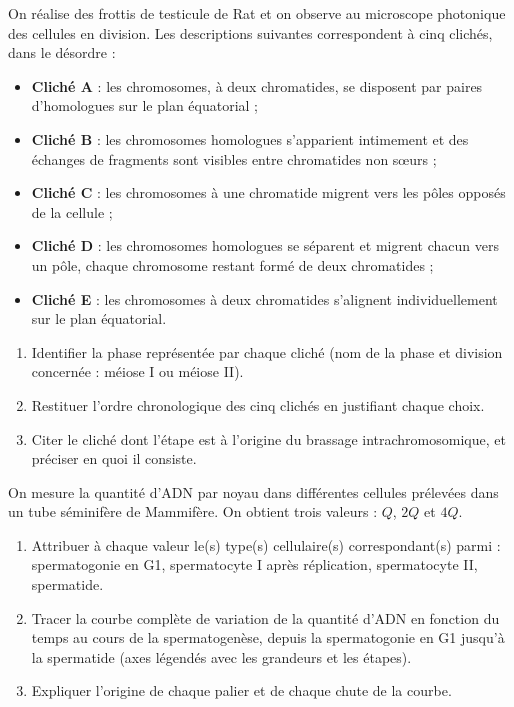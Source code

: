 \documentclass[11pt]{article}
\begin{document}
\begin{exercice}
On réalise des frottis de testicule de Rat et on observe au microscope photonique des cellules en division. Les descriptions suivantes correspondent à cinq clichés, dans le désordre :
\begin{itemize}
\item \textbf{Cliché A} : les chromosomes, à deux chromatides, se disposent par paires d'homologues sur le plan équatorial ;
\item \textbf{Cliché B} : les chromosomes homologues s'apparient intimement et des échanges de fragments sont visibles entre chromatides non sœurs ;
\item \textbf{Cliché C} : les chromosomes à une chromatide migrent vers les pôles opposés de la cellule ;
\item \textbf{Cliché D} : les chromosomes homologues se séparent et migrent chacun vers un pôle, chaque chromosome restant formé de deux chromatides ;
\item \textbf{Cliché E} : les chromosomes à deux chromatides s'alignent individuellement sur le plan équatorial.
\end{itemize}
\begin{enumerate}
\item Identifier la phase représentée par chaque cliché (nom de la phase et division concernée : méiose I ou méiose II).
\item Restituer l'ordre chronologique des cinq clichés en justifiant chaque choix.
\item Citer le cliché dont l'étape est à l'origine du brassage intrachromosomique, et préciser en quoi il consiste.
\end{enumerate}
\end{exercice}

\begin{exercice}
On mesure la quantité d'ADN par noyau dans différentes cellules prélevées dans un tube séminifère de Mammifère. On obtient trois valeurs : $Q$, $2Q$ et $4Q$.
\begin{enumerate}
\item Attribuer à chaque valeur le(s) type(s) cellulaire(s) correspondant(s) parmi : spermatogonie en G1, spermatocyte I après réplication, spermatocyte II, spermatide.
\item Tracer la courbe complète de variation de la quantité d'ADN en fonction du temps au cours de la spermatogenèse, depuis la spermatogonie en G1 jusqu'à la spermatide (axes légendés avec les grandeurs et les étapes).
\item Expliquer l'origine de chaque palier et de chaque chute de la courbe.
\end{enumerate}
\end{exercice}
\end{document}

